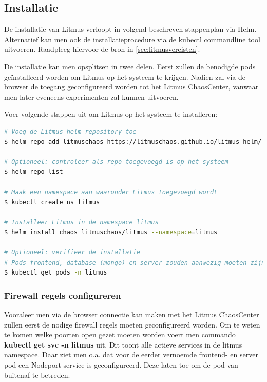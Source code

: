 \subsection{Installatie}

De installatie van Litmus verloopt in volgend beschreven stappenplan via Helm. Alternatief kan men ook de installatieprocedure via de kubectl commandline tool uitvoeren. Raadpleeg hiervoor de bron in \ref{sec:litmusvereisten}.   

De installatie kan men opsplitsen in twee delen. Eerst zullen de benodigde pods geïnstalleerd worden om Litmus op het systeem te krijgen. Nadien zal via de browser de toegang geconfigureerd worden tot het Litmus ChaosCenter, vanwaar men later eveneens experimenten zal kunnen uitvoeren. 

Voer volgende stappen uit om Litmus op het systeem te installeren:
\begin{lstlisting}[language=bash]
# Voeg de Litmus helm repository toe 
$ helm repo add litmuschaos https://litmuschaos.github.io/litmus-helm/

# Optioneel: controleer als repo toegevoegd is op het systeem
$ helm repo list

# Maak een namespace aan waaronder Litmus toegevoegd wordt
$ kubectl create ns litmus

# Installeer Litmus in de namespace litmus
$ helm install chaos litmuschaos/litmus --namespace=litmus

# Optioneel: verifieer de installatie
# Pods frontend, database (mongo) en server zouden aanwezig moeten zijn.
$ kubectl get pods -n litmus
\end{lstlisting}

\subsubsection{Firewall regels configureren}

Vooraleer men via de browser connectie kan maken met het Litmus ChaosCenter zullen eerst de nodige firewall regels moeten geconfigureerd worden. Om te weten te komen welke poorten open gezet moeten worden voert men commando {\bf kubectl get svc -n litmus} uit. \newline Dit toont alle actieve services in de litmus namespace. Daar ziet men o.a. dat voor de eerder vernoemde frontend- en server pod een Nodeport service is geconfigureerd. Deze laten toe om de pod van buitenaf te betreden. 

